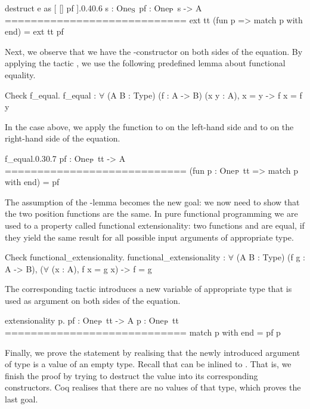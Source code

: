 \begin{cproof1}{destruct e as [ [] pf ].}{0.4}{0.6}
  s : One\(\sb{\text{S}}\)
  pf : One\(\sb{\text{P}}\) s -> A
  ============================
  ext tt (fun p => match p with end) =
  ext tt pf
\end{cproof1}

Next, we observe that we have the \--constructor on both sides of the equation.
By applying the tactic , we use the following predefined lemma about functional equality.

\begin{crepl}
\coqrepl Check f_equal.
  f_equal : \(\forall\) (A B : Type) (f : A -> B) (x y : A), x = y -> f x = f y
\end{crepl}

In the case above, we apply the function  to  on the left\--hand side and to  on the right\--hand side of the equation.
 
\begin{cproof1}{f_equal.}{0.3}{0.7}
  pf : One\(\sb{\text{P}}\) tt -> A
  ============================
  (fun p : One\(\sb{\text{P}}\) tt => match p with end) = pf
\end{cproof1}

The assumption of the \--lemma becomes the new goal: we now need to show that the two position functions are the same.
In pure functional programming we are used to a property called functional extensionality: two functions  and  are equal, if they yield the same result for all possible input arguments of appropriate type.

\begin{crepl}
\coqrepl Check  functional_extensionality.
  functional_extensionality : \(\forall\) (A B : Type) (f g : A -> B),
    (\(\forall\) (x : A), f x = g x) -> f = g
\end{crepl}

The corresponding tactic  introduces a new variable  of appropriate type that is used as argument on both sides of the equation.

\begin{cproof}{extensionality p.}
  pf : One\(\sb{\text{P}}\) tt -> A
  p : One\(\sb{\text{P}}\) tt
  ============================
  match p with end = pf p
\end{cproof}

Finally, we prove the statement by realising that the newly introduced argument  of type  is a value of an empty type.
Recall that  can be inlined to .
That is, we finish the proof by trying to destruct the value  into its corresponding constructors.
Coq realises that there are no values of that type, which proves the last goal.

